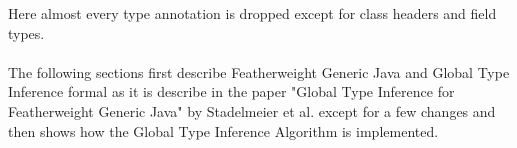 Here almost every type annotation is dropped except for class headers and field types.
\\
\\
The following sections first describe Featherweight Generic Java and Global Type Inference formal as it is describe in the paper "Global Type Inference for Featherweight Generic Java"\cite{FGJ} by Stadelmeier et al. except for a few changes and then shows how the Global Type Inference Algorithm is implemented.
